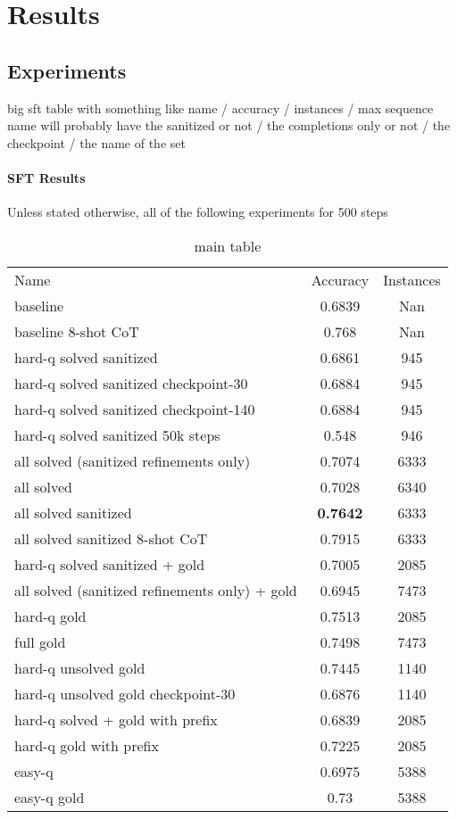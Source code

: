 \documentclass[a4paper,10pt]{article}
\title{}
\author{Jose Rodriguez}
\begin{document}
\maketitle

\begin{abstract}

\end{abstract}

\section{Results}
\subsection{Experiments}
big sft table with something like name / accuracy / instances / max sequence
name will probably have the sanitized or not / the completions only or not / the checkpoint / the name of the set


\paragraph{SFT Results}
Unless stated otherwise, all of the following experiments for 500 steps

\begin{table}[ht]
\centering
\begin{tabular}{lcc}

Name & Accuracy & Instances \\
baseline & 0.6839 & Nan\\
baseline 8-shot CoT & 0.768 & Nan \\
hard-q solved sanitized& 0.6861 & 945\\
hard-q solved sanitized checkpoint-30 & 0.6884 & 945\\
hard-q solved sanitized checkpoint-140 & 0.6884 & 945\\
hard-q solved sanitized 50k steps &  0.548  & 946 \\
all solved (sanitized refinements only)& 0.7074 & 6333\\
all solved & 0.7028 & 6340\\
all solved sanitized & \textbf{0.7642}  & 6333\\
all solved sanitized 8-shot CoT & 0.7915 & 6333 \\ 
hard-q solved sanitized + gold & 0.7005  & 2085\\
all solved (sanitized refinements only) + gold & 0.6945 & 7473 \\
hard-q gold & 0.7513 & 2085 \\
full gold & 0.7498 & 7473 \\
hard-q unsolved gold & 0.7445 & 1140 \\
hard-q unsolved gold checkpoint-30 & 0.6876 & 1140 \\
hard-q solved + gold with prefix & 0.6839 & 2085 \\
hard-q gold with prefix & 0.7225 & 2085 \\
easy-q & 0.6975 & 5388 \\ 
easy-q gold & 0.73 & 5388 \\
\end{tabular}
\caption{main table}
\end{table}
\end{document}
